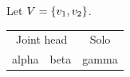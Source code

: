 \documentclass{article}
\let\span\relax
\DeclareMathOperator{\span}{span}
\begin{document}
Let $V=\span\{v_1,v_2\}$.
\begin{tabular}{|c|c|c|}
\multicolumn{2}{|c|}{Joint head} & Solo \\
alpha & beta & gamma \\
\end{tabular}
\end{document}
